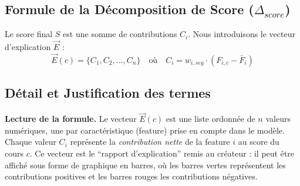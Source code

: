 \documentclass[11pt,a4paper]{article}
\begin{document}
\subsection{Formule de la Décomposition de Score ($\Delta_{score}$)}
Le score final $S$ est une somme de contributions $C_i$. Nous introduisons le vecteur d'explication $\vec{E}$ :
\begin{equation}
\vec{E}(c) = \{ C_1, C_2, ..., C_n \} \quad \text{où} \quad C_i = w_{i, seg} \cdot (F_{i,c} - \bar{F}_i)
\end{equation}

\subsection{Détail et Justification des termes}

\textbf{Lecture de la formule.} Le vecteur $\vec{E}(c)$ est une liste ordonnée de $n$ valeurs numériques, une par caractéristique (feature) prise en compte dans le modèle. Chaque valeur $C_i$ représente la \textit{contribution nette} de la feature $i$ au score du cours $c$. Ce vecteur est le ``rapport d'explication'' remis au créateur : il peut être affiché sous forme de graphique en barres, où les barres vertes représentent les contributions positives et les barres rouges les contributions négatives.
\end{document}

